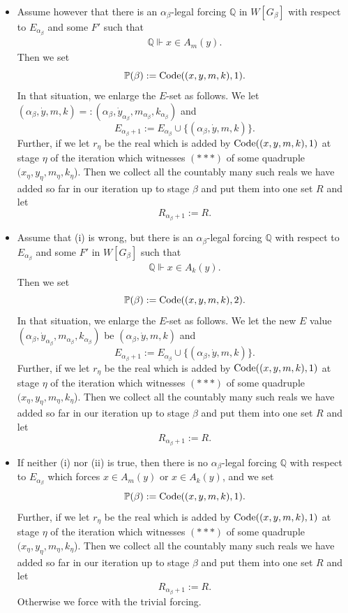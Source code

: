 \documentclass[a4paper,11pt]{article}
\newcommand{\forceP}{\mathbb{P}}
\newcommand{\forceQ}{\mathbb{Q}}
\begin{document}
\begin{itemize}
\begin{itemize}
\item[(i)] Assume however that there is an $\alpha_{\beta}$-legal forcing $\forceQ$ in $W[G_{\beta}]$ with respect to $E_{\alpha_{\beta}}$ and some $F'$ such that 
\begin{align*}
\forceQ \Vdash 
 x \in A_m(y).
\end{align*}
Then we set 
\[\forceP(\beta):= \hbox{Code} (({x}, {y}, m,k), 1).\]
In that situation, we enlarge the $E$-set as follows. We let $(\alpha_{\beta}, \dot{y}, m, k)=: (\alpha_{\beta}, \dot{y}_{\alpha_{\beta}}, m_{\alpha_{\beta}}, k_{\alpha_{\beta}})$ and \[E_{\alpha_{\beta}+1}:= E_{\alpha_{\beta}} \cup \{ (\alpha_{\beta}, \dot{y}, m, k) \} .\]
Further, if we let $r_{\eta}$ be the real which is added by  $\hbox{Code} (({x}, {y}, m,k), 1)$ at stage $\eta$ of the iteration which witnesses $({\ast} {\ast} {\ast})$ of some quadruple $(x_{\eta},y_{\eta},m_{\eta},k_{\eta}$). Then we collect all the countably many such reals we have added so far in our iteration up to stage $\beta$ and put them into one set $R$ and let
\[ R_{\alpha_{\beta}+1 }:= R . \] 
\item[(ii)] Assume that (i) is wrong, but there is an $\alpha_{\beta}$-legal forcing $\forceQ$ with respect to $E_{\alpha_{\beta}}$ and some $F'$  in $W[G_{\beta}]$ such that 
\begin{align*}
\forceQ \Vdash 
 x \in A_k(y).
\end{align*}
Then we set
\[\forceP(\beta):= \hbox{Code} (({x}, {y}, m,k), 2).\]
In that situation, we enlarge the $E$-set as follows. We let the new $E$ value $(\alpha_{\beta}, \dot{y}_{\alpha_{\beta}}, m_{\alpha_{\beta}}, k_{\alpha_{\beta}})$ be $ (\alpha_{\beta}, \dot{y}, m, k)$  and \[E_{\alpha_{\beta}+1}:= E_{\alpha_{\beta}} \cup \{ (\alpha_{\beta}, \dot{y}, m, k) \}.\]
Further, if we let $r_{\eta}$ be the real which is added by  $\hbox{Code} (({x}, {y}, m,k), 1)$ at stage $\eta$ of the iteration which witnesses $({\ast} {\ast} {\ast})$ of some quadruple $(x_{\eta},y_{\eta},m_{\eta},k_{\eta}$). Then we collect all the countably many such reals we have added so far in our iteration up to stage $\beta$ and put them into one set $R$ and let
\[ R_{\alpha_{\beta}+1 }:= R  . \] 

\item[(iii)] If neither (i) nor (ii) is true, then there is no $\alpha_{\beta}$-legal forcing $\forceQ$ with respect to $E_{\alpha_{\beta}}$ which forces $x \in A_m(y)$ or $x \in A_k(y)$, and we set
\[ \forceP(\beta):=\hbox{Code} (({x}, {y}, m,k), 1).\]
Further, if we let $r_{\eta}$ be the real which is added by  $\hbox{Code} (({x}, {y}, m,k), 1)$ at stage $\eta$ of the iteration which witnesses $({\ast} {\ast} {\ast})$ of some quadruple $(x_{\eta},y_{\eta},m_{\eta},k_{\eta}$). Then we collect all the countably many such reals we have added so far in our iteration up to stage $\beta$ and put them into one set $R$ and let
\[ R_{\alpha_{\beta}+1 }:= R . \] 
Otherwise we force with the trivial forcing.
\end{itemize}
 \end{itemize}
\end{document}
